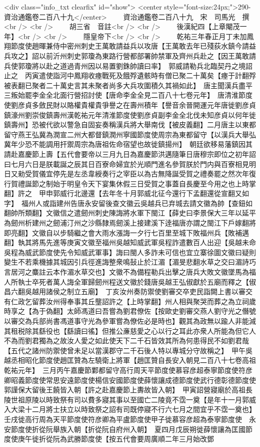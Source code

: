 <div class="info_txt clearfix" id="show">
<center style="font-size:24px;">290-資治通鑑卷二百八十九</center>
  　　資治通鑑卷二百八十九　宋　司馬光　撰<br />
<br />
　　胡三省　音註<br />
<br />
　　後漢紀四【上章閹茂一年】<br />
<br />
　　隱皇帝下<br />
<br />
　　乾祐三年春正月丁未加鳳翔節度使趙暉兼侍中密州刺史王萬敢請益兵以攻唐【王萬敢去年已殘荻水鎮今請益兵攻之】詔以前沂州刺史郭瓊為東路行營都部署帥禁軍及齊州兵赴之【因王萬敢請兵使郭瓊將以赴之道過青州因以易置劉銖帥讀曰率】　郭威請勒兵北臨契丹之境詔止之　丙寅遣使詣河中鳳翔收瘞戰死及餓殍遺骸時有僧已聚二十萬矣【瘞于計翻殍被表翻已聚者二十萬史言其未聚者尚多大兵攻圍積久其禍如此】　唐主聞漢兵盡平三叛始罷李金全北面行營招討使【唐命李金全見二百八十七卷元年】　唐清淮節度使劉彦貞多斂民財以賂權貴權貴爭譽之在壽州積年【譽音余晉開運元年唐徙劉彦貞鎮濠州劉崇俊鎮壽州漢乾祐元年清淮節度使劉彦貞副李金全北伐未知彦貞以何年徙鎮壽州】恐被代欲以警急自固妄奏稱漢兵將大舉南伐【被皮義翻】二月唐主以東都留守燕王弘冀為潤宣二州大都督鎮潤州寧國節度使周宗為東都留守【以漢兵大舉弘冀年少恐不能調用扞禦周宗為唐祖佐命宿望也故徙鎮揚州】　朝廷欲移易藩鎮因其請赴嘉慶節上壽【五代會要帝以三月九日為嘉慶節洪邁隨筆日唐穆宗即位之初年詔曰七月六日是朕載誕之辰其日百寮命婦宜於光順門進名參賀朕於門内與百寮相見明日又勑受賀儀宜停先是左丞韋綬奏行之宰臣以為古無降誕受賀之禮奏罷之然次年復行賀禮誕節之制始于明皇令天下宴集休假三日受賀之事蓋自長慶至今用之也上時掌翻】許之　甲申郭威行北邊還【去年冬十月郭威北征今還行下孟翻還從宣翻又如字】　福州人或詣建州告唐永安留後查文徽云吳越兵已弃城去請文徽為帥【查鈕如翻帥所類翻】文徽信之遣劒州刺史陳誨將水軍下閩江【薛史曰李景保大三年以延平為劒州析建州之劒浦汀州之沙縣隸焉劒溪上接建溪下逹福唐亦謂之閩江下戶嫁翻將即亮翻】文徽自以步騎繼之會大雨水漲誨一夕行七百里至城下敗福州兵【敗補邁翻】執其將馬先進等庚寅文徽至福州吳越知威武軍吳程詐遣數百人出迎【吳越未命吳程為威武節度使先令知威武軍事】誨曰閩人多詐未可信也宜立寨徐圖文徽曰疑則變生不若乘機據其城因引兵徑進誨整衆鳴鼔止於江湄【湄旻悲翻水草之交曰湄詩巧言居河之麋註云本作湄水草交也】文徽不為備程勒兵出擊之唐兵大敗文徽墜馬為福人所執士卒死者萬人誨全軍歸劒州程送文徽於錢唐吳越王弘俶獻於五廟而釋之【俶昌六翻吳越用諸侯之制立五廟】　丁亥汝州奏防禦使劉審交卒吏民詣闕上書以審交有仁政乞留葬汝州得奉事其丘壟詔許之【上時掌翻】州人相與聚哭而葬之為立祠歲時享之【為于偽翻】太師馮道曰吾嘗為劉君僚佐【按歐史劉審交燕人劉守光之僭號以審交為兵部尚書馮道事守光為參軍嘗為僚佐必是時也】觀其為政無以踰人非能減其租税除其繇役也【繇讀曰徭】但推公亷慈愛之心以行之耳此亦衆人所能為但它人不為而劉君獨為之故汝人愛之如此使天下二千石皆效其所為何患得民不如劉君哉【五代之諸州防禦使曾未足以當漢郡守二千石後人特以專城分守故稱之】　甲午吳越丞相昭化節度使趙匡贊為左驍衛上將軍【趙匡贊自長安入朝見二百八十七卷高祖乾祐元年】　三月丙午嘉慶節鄴都留守高行周天平節度使慕容彦超泰寧節度使符彦卿昭義節度使常思安遠節度使楊信安國節度使薛懷讓成德節度使武行德彰德節度使郭謹保大留後王饒皆入朝【許之赴嘉慶節上夀故皆入朝】　甲寅詔營寢廟於高祖長陵世祖原陵以時致祭有司以費多寢其事以至國亡二陵竟不霑一奠【是年十一月郭威入大梁十二月將士扶立以時致祭之詔有司既停寢不行六七月之間宜乎不霑一奠也】壬戌徙高行周為天平節度使符彦卿為平盧節度使甲子徙慕容彦超為泰寧節度使　永安節度使折從阮舉族入朝【折從阮自府州入朝】　夏四月戊辰朔徙薛懷讓為匡國節度使庚午徙折從阮為武勝節度使【按五代會要周廣順二年三月始改鄧